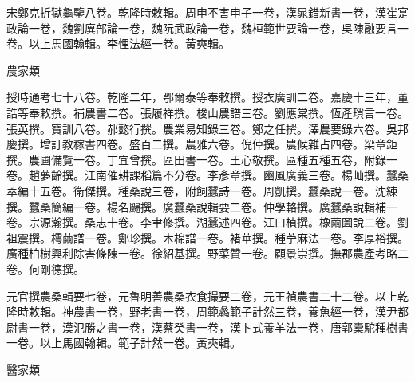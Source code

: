 \begin{pinyinscope}
宋鄭克折獄龜鑒八卷。乾隆時敕輯。周申不害申子一卷，漢晁錯新書一卷，漢崔寔政論一卷，魏劉廙部論一卷，魏阮武政論一卷，魏桓範世要論一卷，吳陳融要言一卷。以上馬國翰輯。李悝法經一卷。黃奭輯。

農家類

授時通考七十八卷。乾隆二年，鄂爾泰等奉敕撰。授衣廣訓二卷。嘉慶十三年，董誥等奉敕撰。補農書二卷。張履祥撰。梭山農譜三卷。劉應棠撰。恆產瑣言一卷。張英撰。寶訓八卷。郝懿行撰。農業易知錄三卷。鄭之任撰。澤農要錄六卷。吳邦慶撰。增訂教稼書四卷。盛百二撰。農雅六卷。倪倬撰。農候雜占四卷。梁章鉅撰。農圃備覽一卷。丁宜曾撰。區田書一卷。王心敬撰。區種五種五卷，附錄一卷。趙夢齡撰。江南催耕課稻篇不分卷。李彥章撰。豳風廣義三卷。楊屾撰。蠶桑萃編十五卷。衛傑撰。種桑說三卷，附飼蠶詩一卷。周凱撰。蠶桑說一卷。沈練撰。蠶桑簡編一卷。楊名颺撰。廣蠶桑說輯要二卷。仲學輅撰。廣蠶桑說輯補一卷。宗源瀚撰。桑志十卷。李聿修撰。湖蠶述四卷。汪曰楨撰。橡繭圖說二卷。劉祖震撰。樗繭譜一卷。鄭珍撰。木棉譜一卷。褚華撰。種苧麻法一卷。李厚裕撰。廣種柏樹興利除害條陳一卷。徐紹基撰。野菜贊一卷。顧景崇撰。撫郡農產考略二卷。何剛德撰。

元官撰農桑輯要七卷，元魯明善農桑衣食撮要二卷，元王禎農書二十二卷。以上乾隆時敕輯。神農書一卷，野老書一卷，周範蠡範子計然三卷，養魚經一卷，漢尹都尉書一卷，漢氾勝之書一卷，漢蔡癸書一卷，漢卜式養羊法一卷，唐郭橐駝種樹書一卷。以上馬國翰輯。範子計然一卷。黃奭輯。

醫家類


\end{pinyinscope}
